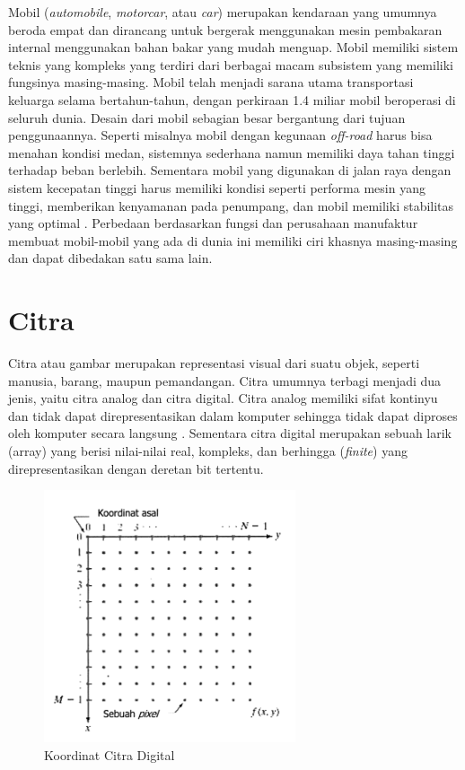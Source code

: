 Mobil (\emph{automobile}, \emph{motorcar}, atau \emph{car}) merupakan kendaraan yang umumnya beroda empat dan dirancang untuk bergerak 
menggunakan mesin pembakaran internal menggunakan bahan bakar yang mudah menguap. Mobil memiliki sistem teknis yang 
kompleks yang terdiri dari berbagai macam subsistem yang memiliki fungsinya masing-masing. Mobil telah menjadi sarana 
utama transportasi keluarga selama bertahun-tahun, dengan perkiraan 1.4 miliar mobil beroperasi di seluruh dunia. Desain 
dari mobil sebagian besar bergantung dari tujuan penggunaannya. Seperti misalnya mobil dengan kegunaan \emph{off-road} harus bisa menahan 
kondisi medan, sistemnya sederhana namun memiliki daya tahan tinggi terhadap beban berlebih. Sementara mobil 
yang digunakan di jalan raya dengan sistem kecepatan tinggi harus memiliki kondisi seperti performa mesin yang tinggi, 
memberikan kenyamanan pada penumpang, dan mobil memiliki stabilitas yang optimal \parencite{Cromer2023}. Perbedaan 
berdasarkan fungsi dan perusahaan manufaktur membuat mobil-mobil yang ada di dunia ini memiliki ciri khasnya masing-masing 
dan dapat dibedakan satu sama lain.

\section{Citra}
\label{sec:citra}

Citra atau gambar merupakan representasi visual dari suatu objek, seperti manusia, barang, maupun pemandangan. Citra 
umumnya terbagi menjadi dua jenis, yaitu citra analog dan citra digital. Citra analog memiliki sifat kontinyu dan tidak 
dapat direpresentasikan dalam komputer sehingga tidak dapat diproses oleh komputer secara langsung \parencite{Tyagi2018}. 
Sementara citra digital merupakan sebuah larik (array) yang berisi nilai-nilai real, kompleks, dan berhingga (\emph{finite}) 
yang direpresentasikan dengan deretan bit tertentu. 

\begin{figure}[ht]
  \centering
  \includegraphics[scale=1]{gambar/Koordinat Citra Digital.png}
  \caption{Koordinat Citra Digital}
  \label{fig:koordinatcitradigital}
\end{figure}

